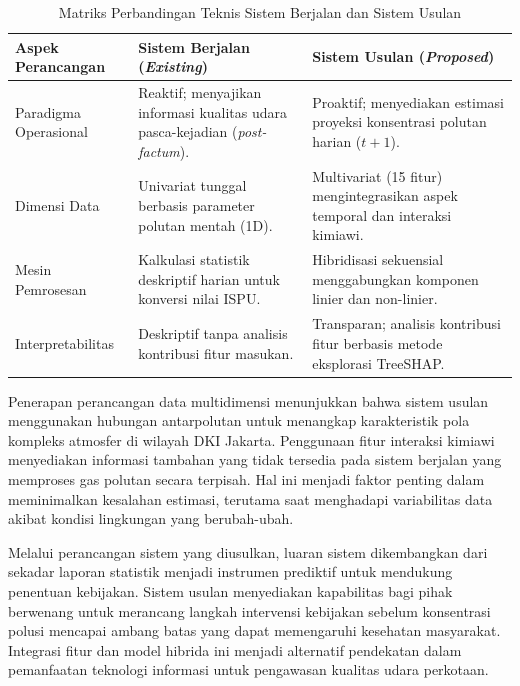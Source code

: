 \begin{table}[htbp]
\centering
\captionsetup{justification=centering}
\setlength{\tabcolsep}{6pt} 
\caption{Matriks Perbandingan Teknis Sistem Berjalan dan Sistem Usulan}
\label{tbl:perbandingan_arsitektur}

\begin{tabularx}{\textwidth}{|>{\raggedright\arraybackslash}p{2.8cm}|
                              >{\raggedright\arraybackslash}X|
                              >{\raggedright\arraybackslash}X|}
\hline
\textbf{Aspek Perancangan} & \textbf{Sistem Berjalan (\textit{Existing})} & \textbf{Sistem Usulan (\textit{Proposed})} \\
\hline
Paradigma Operasional & Reaktif; menyajikan informasi kualitas udara pasca-kejadian (\textit{post-factum}). & Proaktif; menyediakan estimasi proyeksi konsentrasi polutan harian ($t+1$). \\
\hline
Dimensi Data & Univariat tunggal berbasis parameter polutan mentah (1D). & Multivariat (15 fitur) mengintegrasikan aspek temporal dan interaksi kimiawi. \\
\hline
Mesin Pemrosesan & Kalkulasi statistik deskriptif harian untuk konversi nilai ISPU. & Hibridisasi sekuensial menggabungkan komponen linier dan non-linier. \\
\hline
Interpretabilitas & Deskriptif tanpa analisis kontribusi fitur masukan. & Transparan; analisis kontribusi fitur berbasis metode eksplorasi TreeSHAP. \\
\hline
\end{tabularx}
\end{table}

Penerapan perancangan data multidimensi menunjukkan bahwa sistem usulan menggunakan hubungan antarpolutan untuk menangkap karakteristik pola kompleks atmosfer di wilayah DKI Jakarta. Penggunaan fitur interaksi kimiawi menyediakan informasi tambahan yang tidak tersedia pada sistem berjalan yang memproses gas polutan secara terpisah. Hal ini menjadi faktor penting dalam meminimalkan kesalahan estimasi, terutama saat menghadapi variabilitas data akibat kondisi lingkungan yang berubah-ubah.

Melalui perancangan sistem yang diusulkan, luaran sistem dikembangkan dari sekadar laporan statistik menjadi instrumen prediktif untuk mendukung penentuan kebijakan. Sistem usulan menyediakan kapabilitas bagi pihak berwenang untuk merancang langkah intervensi kebijakan sebelum konsentrasi polusi mencapai ambang batas yang dapat memengaruhi kesehatan masyarakat. Integrasi fitur dan model hibrida ini menjadi alternatif pendekatan dalam pemanfaatan teknologi informasi untuk pengawasan kualitas udara perkotaan.

